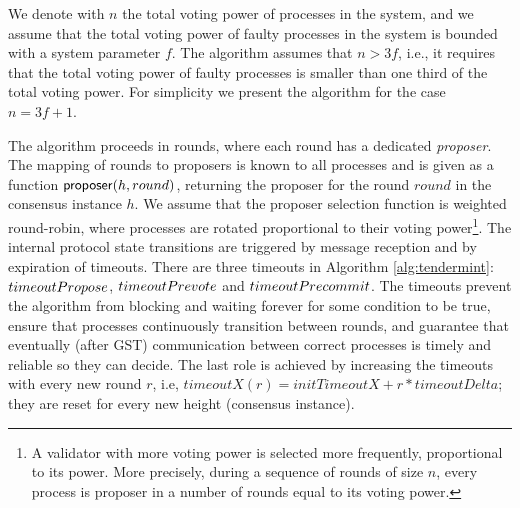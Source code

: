 We denote with $n$ the total voting power of processes in the system, and we
assume that the total voting power of faulty processes in the system is bounded
with a system parameter $f$.  The algorithm assumes that $n > 3f$, i.e., it
requires that the total voting power of faulty processes is smaller than one
third of the total voting power. For simplicity we present the algorithm for
the case $n = 3f + 1$.

The algorithm proceeds in rounds, where each round has a dedicated
\emph{proposer}. The mapping of rounds to proposers is known to all processes
and is given as a function $\coord(h, round)$, returning the proposer for
the round $round$ in the consensus instance $h$. We
assume that the proposer selection function is weighted round-robin, where
processes are rotated proportional to their voting power\footnote{A validator
with more voting power is selected more frequently, proportional to its power.
More precisely, during a sequence of rounds of size $n$, every process is
proposer in a number of rounds equal to its voting power.}. 
The internal protocol state transitions are triggered by message reception and 
by expiration of timeouts. There are three timeouts in Algorithm \ref{alg:tendermint}:
$\timeoutPropose$, $\timeoutPrevote$ and $\timeoutPrecommit$.
The timeouts prevent the algorithm from blocking and
waiting forever for some condition to be true, ensure that processes continuously 
transition between rounds, and guarantee that eventually (after GST) communication 
between correct processes is timely and reliable so they can decide. 
The last role is achieved by increasing the timeouts with every new round $r$, 
i.e, $timeoutX(r) = initTimeoutX + r*timeoutDelta$; 
they are reset for every new height (consensus
instance). 

